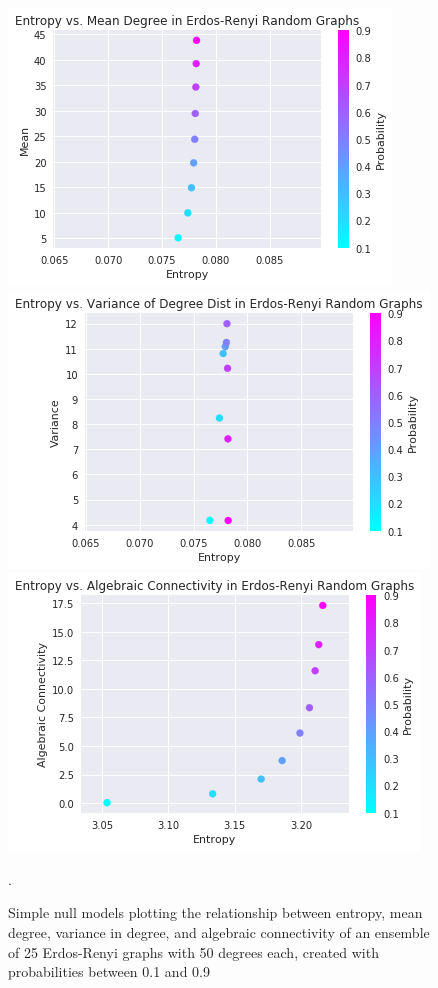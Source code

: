 \documentclass{paper}
\begin{document}
	\begin{figure}[h]
		\centering
		\includegraphics[scale=0.5]{null_ent_mean.png}
		\includegraphics[scale=0.5]{null_ent_var.png}
		\includegraphics[scale=0.5]{null_ent_alg_conn.png}
		\caption{Simple null models plotting the relationship between entropy, mean degree, variance in degree, and algebraic connectivity of an ensemble of 25 Erdos-Renyi graphs with 50 degrees each, created with probabilities between 0.1 and 0.9}.
		\label{entropy-nulls}
	\end{figure}
	
\end{document}
